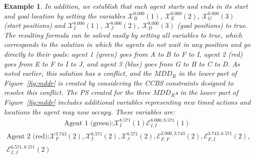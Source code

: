 \documentclass[review]{elsarticle}
\newtheorem{example}{Example}
\newcommand{\mddr}{\ensuremath{MDD_R}\xspace}
\newcommand\roni[1]{\nb{\textbf{Roni:}}{green}{#1}}
\newcommand\pavel[1]{\nb{\textbf{Pavel:}}{blue}{#1}}
\newcommand{\ccbs}{\ac{CCBS}\xspace}
\newcommand{\ps}{\ac{PS}\xspace}
\newcommand{\true}{\textit{true}\xspace}
\begin{document}
\begin{example}
In addition, we establish that each agent starts and ends in its start and goal location by setting the variables $\mathcal{X}_B^{0.000}(1)$, $\mathcal{X}_E^{0.000}(2)$, $\mathcal{X}_G^{0.000}(3)$ (start positions) and $\mathcal{X}_I^{8.000}(1)$, $\mathcal{X}_J^{8.000}(2)$, $\mathcal{X}_D^{8.000}(3)$ (goal positions) to \true.
The resulting formula can be solved easily by setting all variables to \true, which corresponds to the solution in which the agents do not wait in any position and go directly to their goals: agent 1 (green) goes from A to B to F to I, agent 2 (red) goes  from E to F to I to J, 
and agent 3 (blue) goes from G to H to C to D. 
As noted earlier, this solution has a conflict, and the \mddr in the lower part of Figure~\ref{fig:mddr} is created by considering the \ccbs constraints designed to resolve this conflict. 
The \ps created for the three $MDD_R$s in the lower part of Figure~\ref{fig:mddr} includes additional variables representing new timed actions and locations the agent may now occupy. 
These variables are:
\begin{multline*}
\text{Agent 1 (green):} \mathcal{X}_I^{8.571}(1) \mathcal{E}_{I,I}^{8.000,8.571}(1)
\end{multline*}
\begin{multline*}
\text{Agent 2 (red):} \mathcal{X}_F^{3.743}(2), \mathcal{X}_I^{6.571}(2), \mathcal{X}_J^{8.571}(2), \mathcal{E}_{F,F}^{2.000,3.743}(2), \mathcal{E}_{F,I}^{3.743,6.571}(2),\\ \mathcal{E}_{I,J}^{6.571,8.571}(2)    

\end{multline*}
\end{example}
\end{document}
